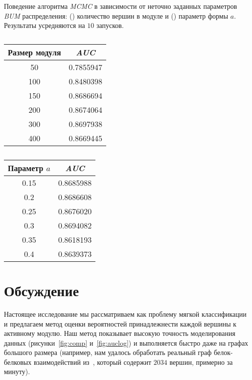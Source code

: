 \begin{table}[!htb]
    \captionsetup{justification=centering}
    \caption{
        Поведение алгоритма \emph{MCMC} в зависимости от неточно заданных
        параметров \emph{BUM} распределения: () количество
        вершин в модуле и () параметр формы $a$. Результаты
        усредняются на $10$ запусков.
    }
    \label{tab:bla}
    \begin{subtable}{.5\linewidth}
        \caption{}
        \begin{tabular}{c|c}
                Размер модуля &   \emph{AUC} \\
                \hline
                50 & 0.7855947 \\
                100 & 0.8480398 \\
                150 & 0.8686694 \\
                200 & 0.8674064 \\
                300 & 0.8697938 \\
                400 & 0.8669445 \\
        \end{tabular}
        \label{tab:lambda}
    \end{subtable}%
    \begin{subtable}{.5\linewidth}
        \caption{}
        \begin{tabular}{c|c}
            Параметр $a$ &   \emph{AUC} \\
            \hline
            0.15 & 0.8685988 \\
            0.2  & 0.8686608 \\
            0.25 & 0.8676020  \\
            0.3 & 0.8694082 \\
            0.35 & 0.8618193 \\
            0.4 & 0.8639373 \\
        \end{tabular}
        \label{tab:a}
    \end{subtable}
\end{table}





\section{Обсуждение}

Настоящее исследование мы рассматриваем как проблему мягкой классификации
и предлагаем метод оценки вероятностей принадлежнести каждой вершины
к активному модулю.  Наш метод показывает высокую точность моделирования данных
(рисунки~\ref{fig:comp} и~\ref{fig:auclog}) и выполняется быстро даже на графах
большого размера (например, нам удалось обработать реальный граф белок-белковых
взаимодействий из~\cite{Dittrich2008a}, который содержит $2034$ вершин,
примерно за минуту).

